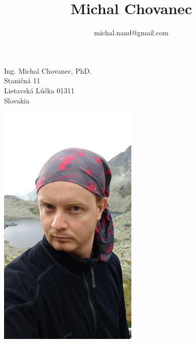 \documentclass[10pt]{article}
\title{\bfseries\Huge Michal Chovanec}
\author{michal.nand@gmail.com}
\date{}
\begin{document}
\maketitle





\begin{minipage}{0.5\textwidth}

	Ing. Michal Chovanec, PhD. \\
	Staničná 11\\
	Lietavská Lúčka 01311\\
	Slovakia

\end{minipage} \hfill
\begin{minipage}{0.45\textwidth}

	\begin{flushright}
	\includegraphics[width=0.5\textwidth]{photo2.jpg}
	\end{flushright}

\end{minipage}
\end{document}
